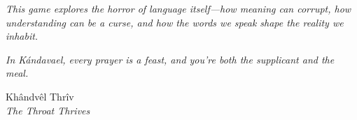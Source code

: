 \documentclass[11pt,a4paper,twoside]{book}
\begin{document}
\textit{This game explores the horror of language itself—how meaning can corrupt, how understanding can be a curse, and how the words we speak shape the reality we inhabit.}

\vspace{1em}

\textit{In Kándavael, every prayer is a feast, and you're both the supplicant and the meal.}

\vspace{2em}

\begin{center}
\Huge\runefont
Khândvêl Thrîv\\
\normalsize
\vspace{0.5em}
\textit{The Throat Thrives}
\end{center}
\end{document}
